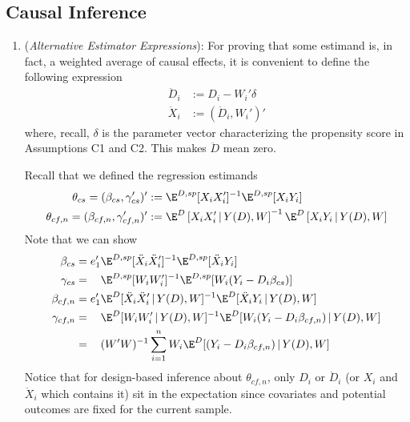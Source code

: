 \documentclass[12pt]{article}
\theoremstyle{plain}
\theoremstyle{definition}
\theoremstyle{remark}
\newcommand{\sumin}{\sum^n_{i=1}}
\begin{document}
\clearpage
\subsection{Causal Inference}

\begin{enumerate}
  \item
    (\emph{Alternative Estimator Expressions}):
    For proving that some estimand is, in fact, a weighted average of
    causal effects, it is convenient to define the following expression
    \begin{align*}
        \ddot{D}_i
        &:=
        D_i-W_i'\delta
        \\
        \ddot{X}_i
        &:=
        (\ddot{D}_i,W_i')'
    \end{align*}
    where, recall, $\delta$ is the parameter vector characterizing the
    propensity score in Assumptions C1 and C2.
    This makes $\ddot{D}$ mean zero.

    Recall that we defined the regression estimands
    \begin{align*}
      \theta_{cs}
      =
      (\beta_{cs},
      \gamma_{cs}')'
      &:=
      \E^{D,sp}[X_iX_i']^{-1}
      \E^{D,sp}[X_iY_i]
      \\
      \theta_{cf,n}
      =
      (\beta_{cf,n},
      \gamma_{cf,n}')'
      &:=
      \E^D\left[ {X}_i{X}_i' \,|\, Y(D),W \right]^{-1}
      \E^D \left[ {X}_iY_i \,|\, Y(D),W \right]
    \end{align*}
    Note that we can show
    \begin{align*}
      \beta_{cs}
      &=
      e_1'
      \E^{D,sp}[\ddot{X}_i\ddot{X}_i']^{-1}
      \E^{D,sp}[\ddot{X}_iY_i]
      \\
      \gamma_{cs}
      &=
      \hphantom{e_1'}
      \E^{D,sp}[{W}_i{W}_i']^{-1}
      \E^{D,sp}[{W}_i(Y_i-D_i\beta_{cs})]
      \\
      \beta_{cf,n}
      &=
      e_1'
      \E^{D}[\ddot{X}_i\ddot{X}_i'\,|\,Y(D),W]^{-1}
      \E^{D}[\ddot{X}_iY_i\,|\,Y(D),W]
      \\
      \gamma_{cf,n}
      &=
      \hphantom{e_1'}
      \E^{D}[{W}_i{W}_i'\,|\,Y(D),W]^{-1}
      \E^{D}[{W}_i(Y_i-D_i\beta_{cf,n})\,|\,Y(D),W]
      \\
      &=
      \hphantom{e_1'}
      (W'W)^{-1}
      \sumin
      {W}_i
      \E^{D}[(Y_i-D_i\beta_{cf,n})\,|\,Y(D),W]
    \end{align*}
    Notice that for design-based inference about $\theta_{cf,n}$, only
    $D_i$ or $\ddot{D}_i$ (or $X_i$ and $\ddot{X}_i$ which contains it)
    sit in the expectation since covariates and potential outcomes are
    fixed for the current sample.



\end{enumerate}
\end{document}
